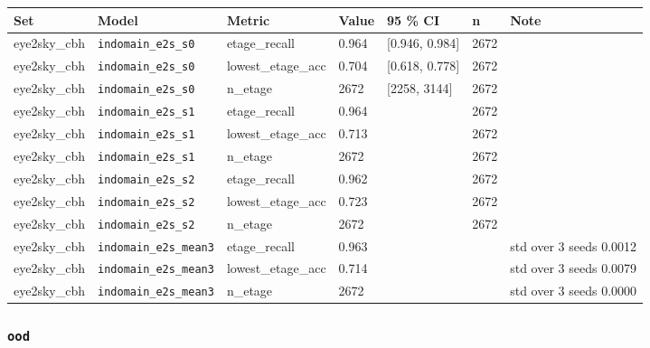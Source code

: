 \begin{center}{\scriptsize\setlength{\tabcolsep}{3pt}
\begin{tabular}{lllllll}
\toprule
Set & Model & Metric & Value & 95 \% CI & n & Note \\
\midrule
eye2sky\_cbh & \texttt{indomain\_\allowbreak{}e2s\_\allowbreak{}s0} & etage\_recall & 0.964 & [0.946, 0.984] & 2672 &  \\
eye2sky\_cbh & \texttt{indomain\_\allowbreak{}e2s\_\allowbreak{}s0} & lowest\_etage\_acc & 0.704 & [0.618, 0.778] & 2672 &  \\
eye2sky\_cbh & \texttt{indomain\_\allowbreak{}e2s\_\allowbreak{}s0} & n\_etage & 2672 & [2258, 3144] & 2672 &  \\
eye2sky\_cbh & \texttt{indomain\_\allowbreak{}e2s\_\allowbreak{}s1} & etage\_recall & 0.964 &  & 2672 &  \\
eye2sky\_cbh & \texttt{indomain\_\allowbreak{}e2s\_\allowbreak{}s1} & lowest\_etage\_acc & 0.713 &  & 2672 &  \\
eye2sky\_cbh & \texttt{indomain\_\allowbreak{}e2s\_\allowbreak{}s1} & n\_etage & 2672 &  & 2672 &  \\
eye2sky\_cbh & \texttt{indomain\_\allowbreak{}e2s\_\allowbreak{}s2} & etage\_recall & 0.962 &  & 2672 &  \\
eye2sky\_cbh & \texttt{indomain\_\allowbreak{}e2s\_\allowbreak{}s2} & lowest\_etage\_acc & 0.723 &  & 2672 &  \\
eye2sky\_cbh & \texttt{indomain\_\allowbreak{}e2s\_\allowbreak{}s2} & n\_etage & 2672 &  & 2672 &  \\
eye2sky\_cbh & \texttt{indomain\_\allowbreak{}e2s\_\allowbreak{}mean3} & etage\_recall & 0.963 &  &  & std over 3 seeds 0.0012 \\
eye2sky\_cbh & \texttt{indomain\_\allowbreak{}e2s\_\allowbreak{}mean3} & lowest\_etage\_acc & 0.714 &  &  & std over 3 seeds 0.0079 \\
eye2sky\_cbh & \texttt{indomain\_\allowbreak{}e2s\_\allowbreak{}mean3} & n\_etage & 2672 &  &  & std over 3 seeds 0.0000 \\
\bottomrule
\end{tabular}}
\end{center}

\subsubsection{\texttt{ood}}

